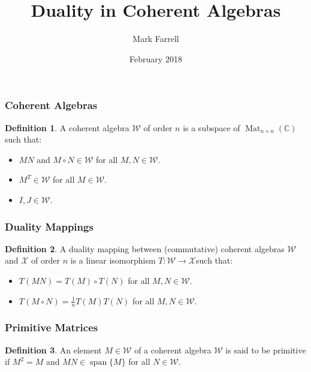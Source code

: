 \documentclass[notheorems]{beamer}
\title{Duality in Coherent Algebras}
\author{Mark Farrell}
\date{February 2018}
\theoremstyle{definition} %
\newtheorem{definition}{Definition}[section] %
\begin{document}
\begin{frame}
\titlepage
\end{frame}

\begin{frame}

\frametitle{Coherent Algebras}

	\begin{definition}

		  A coherent algebra $\mathcal{W}$ of order $n$ is a subspace of $\operatorname{Mat}_{n \times n}(\mathbb{C})$ such that:

		  \begin{itemize}
		  	\item $M N$ and $M \circ N \in \mathcal{W}$ for all $M, N \in \mathcal{W}$.
		  	\item $M^{T} \in \mathcal{W}$ for all $M \in \mathcal{W}$.
		  	\item $I, J \in \mathcal{W}$.
		  \end{itemize}

  \end{definition}

\end{frame}

\begin{frame}

\frametitle{Duality Mappings}

	\begin{definition}
		A duality mapping between (commutative) coherent algebras $\mathcal{W}$ and $\mathcal{X}$ of order $n$ is a linear isomorphism $T : \mathcal{W} \to \mathcal{X}$such that:

			\begin{itemize}
		  		\item $T(M N) = T(M) \circ T(N) $ for all $M, N \in \mathcal{W}$.
		  		\item $T (M \circ N) = \frac{1}{n} T(M) T(N)$ for all $M, N \in \mathcal{W}$.
			\end{itemize}

  	\end{definition}

\end{frame}

\begin{frame}

\frametitle{Primitive Matrices}

	\begin{definition}
		An element $M \in \mathcal{W}$ of a coherent algebra $\mathcal{W}$ is said to be primitive if $M^{2} = M$ and $M N \in \operatorname{span} \{ M \}$ for all $N \in \mathcal{W}$.
	\end{definition}

\end{frame}
\end{document}
